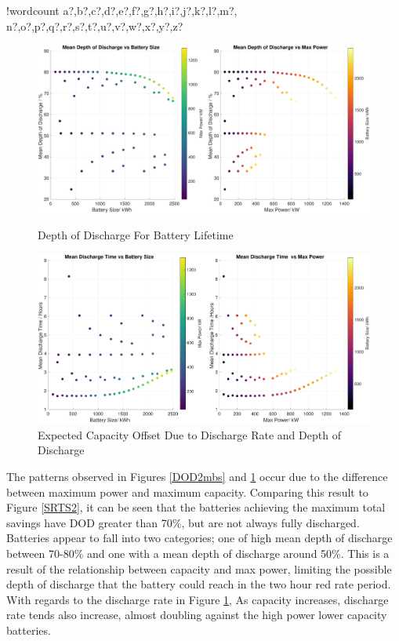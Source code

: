 \documentclass[fontsize=9.5pt]{extarticle}
\numberwithin{figure}{section} %
\newcounter{words}
\newenvironment{counted}{%
  \setcounter{words}{0}
  \SearchList!{wordcount}{\stepcounter{words}}
    {a?,b?,c?,d?,e?,f?,g?,h?,i?,j?,k?,l?,m?,
    n?,o?,p?,q?,r?,s?,t?,u?,v?,w?,x?,y?,z?}
  \UndoBoundary{'}
  \SearchOrder{p;}}{%
  \StopSearching}
\begin{document}
\begin{counted}
\begin{figure}[H]
\centering
\begin{minipage}{.495\textwidth}
  \centering
  \includegraphics[trim = 0 0 0 0, clip, width=1\textwidth]{DOD1bs.pdf}
 \caption{Depth of Discharge For Battery Lifetime}
 \label{DOD2mbs}
\end{minipage}
\hfill
\begin{minipage}{.495\textwidth}
  \centering
   \includegraphics[trim = 0 0 0 0, clip, width=1\textwidth]{Dist1bs.pdf}
   \caption{Expected Capacity Offset Due to Discharge Rate and Depth of Discharge}
  \label{Dist1}
\end{minipage}
\vspace{-10pt}
\end{figure}

The patterns observed in Figures \ref{DOD2mbs} and \ref{Dist1} occur due
to the difference between maximum power and maximum capacity. Comparing
this result to Figure \ref{SRTS2}, it can be seen that the batteries
achieving the maximum total savings have DOD greater than 70\%, but are
not always fully discharged. Batteries appear to fall into two
categories; one of high mean depth of discharge between 70-80\% and one
with a mean depth of discharge around 50\%. This is a result of the
relationship between capacity and max power, limiting the possible depth
of discharge that the battery could reach in the two hour red rate
period. With regards to the discharge rate in Figure \ref{Dist1}, As
capacity increases, discharge rate tends also increase, almost doubling
against the high power lower capacity batteries.


\end{counted}
\end{document}
